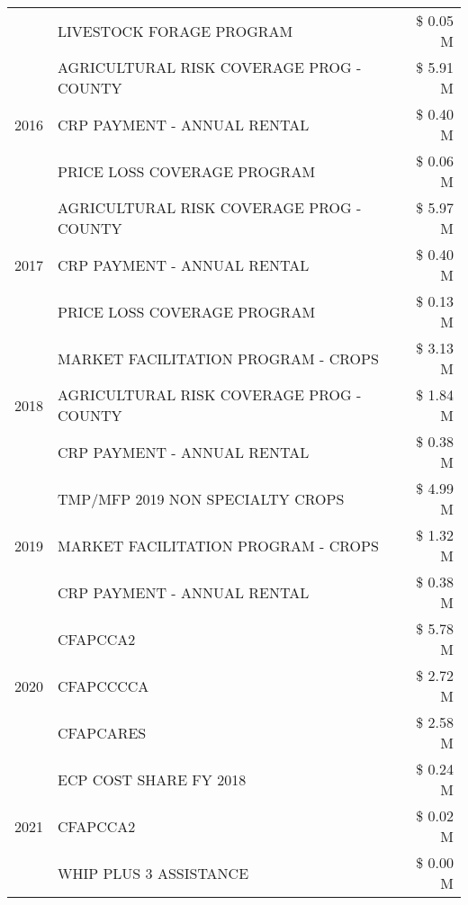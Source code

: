 \begin{tabular}{llr}
 & LIVESTOCK FORAGE PROGRAM & \$ 0.05 M \\
\cline{1-3}
\multirow[t]{3}{*}{2016} & AGRICULTURAL RISK COVERAGE PROG - COUNTY & \$ 5.91 M \\
 & CRP PAYMENT - ANNUAL RENTAL & \$ 0.40 M \\
 & PRICE LOSS COVERAGE PROGRAM & \$ 0.06 M \\
\cline{1-3}
\multirow[t]{3}{*}{2017} & AGRICULTURAL RISK COVERAGE PROG - COUNTY & \$ 5.97 M \\
 & CRP PAYMENT - ANNUAL RENTAL & \$ 0.40 M \\
 & PRICE LOSS COVERAGE PROGRAM & \$ 0.13 M \\
\cline{1-3}
\multirow[t]{3}{*}{2018} & MARKET FACILITATION PROGRAM - CROPS & \$ 3.13 M \\
 & AGRICULTURAL RISK COVERAGE PROG - COUNTY & \$ 1.84 M \\
 & CRP PAYMENT - ANNUAL RENTAL & \$ 0.38 M \\
\cline{1-3}
\multirow[t]{3}{*}{2019} & TMP/MFP 2019 NON SPECIALTY CROPS & \$ 4.99 M \\
 & MARKET FACILITATION PROGRAM - CROPS & \$ 1.32 M \\
 & CRP PAYMENT - ANNUAL RENTAL & \$ 0.38 M \\
\cline{1-3}
\multirow[t]{3}{*}{2020} & CFAPCCA2 & \$ 5.78 M \\
 & CFAPCCCCA & \$ 2.72 M \\
 & CFAPCARES & \$ 2.58 M \\
\cline{1-3}
\multirow[t]{3}{*}{2021} & ECP COST SHARE FY 2018 & \$ 0.24 M \\
 & CFAPCCA2 & \$ 0.02 M \\
 & WHIP PLUS 3 ASSISTANCE & \$ 0.00 M \\
\cline{1-3}
\bottomrule
\end{tabular}
